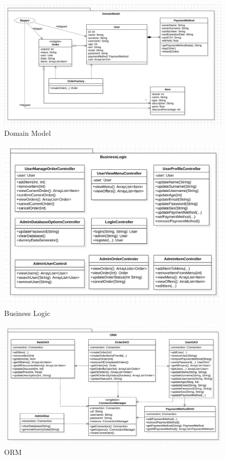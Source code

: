 \documentclass{article}
\begin{document}
   \begin{figure}[h]
        \centering
        \includegraphics[width=1.0\textwidth]{imgs/DomainModelVer2.png}
        \caption{Domain Model}
        \label{domainModel}
    \end{figure}

    \begin{figure}[h]
        \centering
        \includegraphics[width=1.0\textwidth]{imgs/BusinessLogic.png}
        \caption{Business Logic}
        \label{business_logic}
    \end{figure}

    \begin{figure}[h]
       \centering
       \includegraphics[width=1.0\textwidth]{imgs/ORM.png}
       \caption{ORM}
        \label{orm}
    \end{figure}
\clearpage
\end{document}
